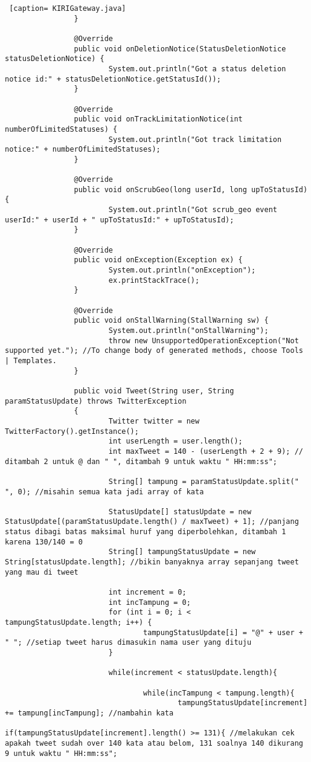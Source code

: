 \begin{lstlisting} [caption= KIRIGateway.java]
				}

				@Override
				public void onDeletionNotice(StatusDeletionNotice statusDeletionNotice) {
						System.out.println("Got a status deletion notice id:" + statusDeletionNotice.getStatusId());
				}

				@Override
				public void onTrackLimitationNotice(int numberOfLimitedStatuses) {
						System.out.println("Got track limitation notice:" + numberOfLimitedStatuses);
				}

				@Override
				public void onScrubGeo(long userId, long upToStatusId) {
						System.out.println("Got scrub_geo event userId:" + userId + " upToStatusId:" + upToStatusId);
				}

				@Override
				public void onException(Exception ex) {
						System.out.println("onException");
						ex.printStackTrace();
				}

				@Override
				public void onStallWarning(StallWarning sw) {
						System.out.println("onStallWarning");
						throw new UnsupportedOperationException("Not supported yet."); //To change body of generated methods, choose Tools | Templates.
				}
				
				public void Tweet(String user, String paramStatusUpdate) throws TwitterException
				{
						Twitter twitter = new TwitterFactory().getInstance();
						int userLength = user.length();
						int maxTweet = 140 - (userLength + 2 + 9); // ditambah 2 untuk @ dan " ", ditambah 9 untuk waktu " HH:mm:ss";
						
						String[] tampung = paramStatusUpdate.split(" ", 0); //misahin semua kata jadi array of kata
						
						StatusUpdate[] statusUpdate = new StatusUpdate[(paramStatusUpdate.length() / maxTweet) + 1]; //panjang status dibagi batas maksimal huruf yang diperbolehkan, ditambah 1 karena 130/140 = 0
						String[] tampungStatusUpdate = new String[statusUpdate.length]; //bikin banyaknya array sepanjang tweet yang mau di tweet
						
						int increment = 0;
						int incTampung = 0;
						for (int i = 0; i < tampungStatusUpdate.length; i++) {
								tampungStatusUpdate[i] = "@" + user + " "; //setiap tweet harus dimasukin nama user yang dituju
						}
						
						while(increment < statusUpdate.length){
								
								while(incTampung < tampung.length){
										tampungStatusUpdate[increment] += tampung[incTampung]; //nambahin kata
										if(tampungStatusUpdate[increment].length() >= 131){ //melakukan cek apakah tweet sudah over 140 kata atau belom, 131 soalnya 140 dikurang 9 untuk waktu " HH:mm:ss";
												

\end{lstlisting}

